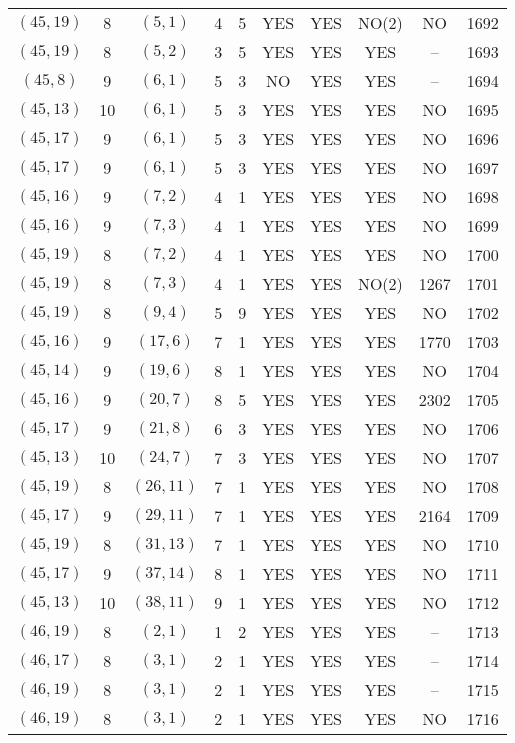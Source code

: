 \begin{longtable}{|c|c|c|c|c|c|c|c|c|c|}
$(45, 19)$ & 8 & $(5, 1)$ & 4 & 5 & YES & YES & NO(2) & NO & 1692\\
$(45, 19)$ & 8 & $(5, 2)$ & 3 & 5 & YES & YES & YES & -- & 1693\\
$(45, 8)$ & 9 & $(6, 1)$ & 5 & 3 & NO & YES & YES & -- & 1694\\
$(45, 13)$ & 10 & $(6, 1)$ & 5 & 3 & YES & YES & YES & NO & 1695\\
$(45, 17)$ & 9 & $(6, 1)$ & 5 & 3 & YES & YES & YES & NO & 1696\\
$(45, 17)$ & 9 & $(6, 1)$ & 5 & 3 & YES & YES & YES & NO & 1697\\
$(45, 16)$ & 9 & $(7, 2)$ & 4 & 1 & YES & YES & YES & NO & 1698\\
$(45, 16)$ & 9 & $(7, 3)$ & 4 & 1 & YES & YES & YES & NO & 1699\\
$(45, 19)$ & 8 & $(7, 2)$ & 4 & 1 & YES & YES & YES & NO & 1700\\
$(45, 19)$ & 8 & $(7, 3)$ & 4 & 1 & YES & YES & NO(2) & 1267 & 1701\\
$(45, 19)$ & 8 & $(9, 4)$ & 5 & 9 & YES & YES & YES & NO & 1702\\
$(45, 16)$ & 9 & $(17, 6)$ & 7 & 1 & YES & YES & YES & 1770 & 1703\\
$(45, 14)$ & 9 & $(19, 6)$ & 8 & 1 & YES & YES & YES & NO & 1704\\
$(45, 16)$ & 9 & $(20, 7)$ & 8 & 5 & YES & YES & YES & 2302 & 1705\\
$(45, 17)$ & 9 & $(21, 8)$ & 6 & 3 & YES & YES & YES & NO & 1706\\
$(45, 13)$ & 10 & $(24, 7)$ & 7 & 3 & YES & YES & YES & NO & 1707\\
$(45, 19)$ & 8 & $(26, 11)$ & 7 & 1 & YES & YES & YES & NO & 1708\\
$(45, 17)$ & 9 & $(29, 11)$ & 7 & 1 & YES & YES & YES & 2164 & 1709\\
$(45, 19)$ & 8 & $(31, 13)$ & 7 & 1 & YES & YES & YES & NO & 1710\\
$(45, 17)$ & 9 & $(37, 14)$ & 8 & 1 & YES & YES & YES & NO & 1711\\
$(45, 13)$ & 10 & $(38, 11)$ & 9 & 1 & YES & YES & YES & NO & 1712\\
$(46, 19)$ & 8 & $(2, 1)$ & 1 & 2 & YES & YES & YES & -- & 1713\\
$(46, 17)$ & 8 & $(3, 1)$ & 2 & 1 & YES & YES & YES & -- & 1714\\
$(46, 19)$ & 8 & $(3, 1)$ & 2 & 1 & YES & YES & YES & -- & 1715\\
$(46, 19)$ & 8 & $(3, 1)$ & 2 & 1 & YES & YES & YES & NO & 1716\\

\end{longtable}
